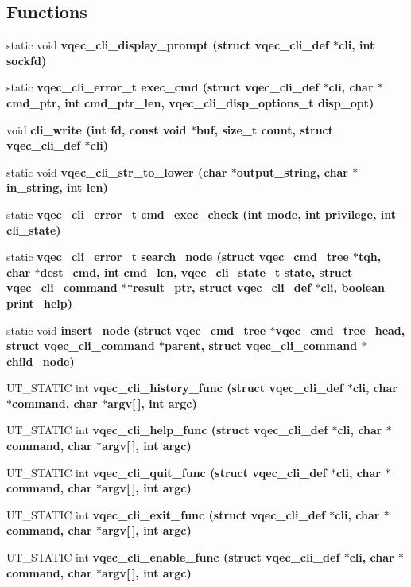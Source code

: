 \subsection*{Functions}
\begin{CompactItemize}
\item 
static void \bf{vqec\_\-cli\_\-display\_\-prompt} (struct \bf{vqec\_\-cli\_\-def} $\ast$cli, int sockfd)
\item 
static \bf{vqec\_\-cli\_\-error\_\-t} \bf{exec\_\-cmd} (struct \bf{vqec\_\-cli\_\-def} $\ast$cli, char $\ast$cmd\_\-ptr, int cmd\_\-ptr\_\-len, \bf{vqec\_\-cli\_\-disp\_\-options\_\-t} disp\_\-opt)
\item 
void \bf{cli\_\-write} (int fd, const void $\ast$buf, size\_\-t count, struct \bf{vqec\_\-cli\_\-def} $\ast$cli)
\item 
static void \bf{vqec\_\-cli\_\-str\_\-to\_\-lower} (char $\ast$output\_\-string, char $\ast$in\_\-string, int len)
\item 
static \bf{vqec\_\-cli\_\-error\_\-t} \bf{cmd\_\-exec\_\-check} (int mode, int privilege, int cli\_\-state)
\item 
static \bf{vqec\_\-cli\_\-error\_\-t} \bf{search\_\-node} (struct vqec\_\-cmd\_\-tree $\ast$tqh, char $\ast$dest\_\-cmd, int cmd\_\-len, \bf{vqec\_\-cli\_\-state\_\-t} state, struct \bf{vqec\_\-cli\_\-command} $\ast$$\ast$result\_\-ptr, struct \bf{vqec\_\-cli\_\-def} $\ast$cli, boolean print\_\-help)
\item 
static void \bf{insert\_\-node} (struct vqec\_\-cmd\_\-tree $\ast$vqec\_\-cmd\_\-tree\_\-head, struct \bf{vqec\_\-cli\_\-command} $\ast$parent, struct \bf{vqec\_\-cli\_\-command} $\ast$child\_\-node)
\item 
UT\_\-STATIC int \bf{vqec\_\-cli\_\-history\_\-func} (struct \bf{vqec\_\-cli\_\-def} $\ast$cli, char $\ast$command, char $\ast$argv[$\,$], int argc)
\item 
UT\_\-STATIC int \bf{vqec\_\-cli\_\-help\_\-func} (struct \bf{vqec\_\-cli\_\-def} $\ast$cli, char $\ast$command, char $\ast$argv[$\,$], int argc)
\item 
UT\_\-STATIC int \bf{vqec\_\-cli\_\-quit\_\-func} (struct \bf{vqec\_\-cli\_\-def} $\ast$cli, char $\ast$command, char $\ast$argv[$\,$], int argc)
\item 
UT\_\-STATIC int \bf{vqec\_\-cli\_\-exit\_\-func} (struct \bf{vqec\_\-cli\_\-def} $\ast$cli, char $\ast$command, char $\ast$argv[$\,$], int argc)
\item 
UT\_\-STATIC int \bf{vqec\_\-cli\_\-enable\_\-func} (struct \bf{vqec\_\-cli\_\-def} $\ast$cli, char $\ast$command, char $\ast$argv[$\,$], int argc)
$$
\end{CompactItemize}
